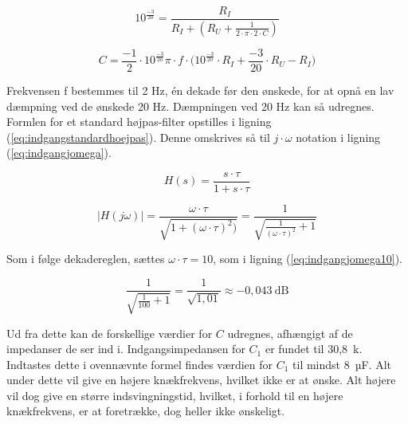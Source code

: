 \begin{equation}
\label{eq:indgang2pif}
10^{\frac{-3}{20}}=\frac{R_I}{R_I+(R_U+\frac{1}{2\cdot\pi\cdot 2\cdot C})}
\end{equation}

\begin{equation}
\label{eq:indgangcudregning}
C=\frac{-1}{2}\cdot{10^{\frac{-3}{20}}}{\pi\cdot f\cdot(10^{\frac{-3}{20}}\cdot R_I+\frac{-3}{20}}\cdot R_U - R_I)
\end{equation}

Frekvensen f bestemmes til 2 Hz, én dekade før den ønskede, for at opnå en lav dæmpning ved de ønskede 20 Hz. Dæmpningen ved 20 Hz kan så udregnes. Formlen for et standard højpas-filter opstilles i ligning (\ref{eq:indgangstandardhoejpas}). Denne omskrives så til $j\cdot\omega$ notation i ligning (\ref{eq:indgangjomega}).

\begin{equation}
\label{eq:indgangstandardhoejpas}
H(s)=\frac{s\cdot\tau}{1+s\cdot\tau}
\end{equation}

\begin{equation}
\label{eq:indgangjomega}
|H(j\omega)|=\frac{\omega\cdot\tau}{\sqrt{1+(\omega\cdot\tau)^2)}}=\frac{1}{\sqrt{\frac{1}{(\omega\cdot\tau)^2}+1}}
\end{equation}

Som i følge dekadereglen, sættes $\omega\cdot\tau = 10$, som i ligning (\ref{eq:indgangjomega10}).

\begin{equation}
\label{eq:indgangjomega10}
\frac{1}{\sqrt{\frac{1}{100}+1}}=\frac{1}{\sqrt{1,01}}\approx -0,043~\mathrm{dB}
\end{equation}

Ud fra dette kan de forskellige værdier for $C$ udregnes, afhængigt af de impedanser de ser ind i.
Indgangsimpedansen for $C_1$ er fundet til 30,8~k\ohm . Indtastes dette i ovennævnte formel findes værdien for $C_1$ til mindst 8~µF. Alt under dette vil give en højere knækfrekvens, hvilket ikke er at ønske. Alt højere vil dog give en større indsvingningstid, hvilket, i forhold til en højere knækfrekvens, er at foretrække, dog heller ikke ønskeligt.


